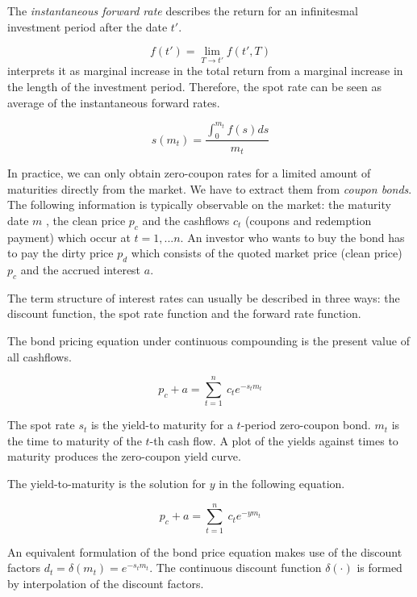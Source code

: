 The \emph{instantaneous forward rate} describes the return for an infinitesmal investment period after the date $t'$.

\begin{equation}
  \label{eq:instforw}
  f(t') = \lim_{T\rightarrow t'}f(t',T)
\end{equation}
\cite{Svensson1994} interprets it as marginal increase in the total return from a marginal increase in the length of the investment period. Therefore, the spot rate can be seen as average of the instantaneous forward rates.

\begin{equation}
  \label{eq:avgforwardrate}
  s(m_t)=\frac{\int_0^{m_t}f(s)ds}{m_t}
\end{equation}

In practice, we can only obtain zero-coupon rates for a limited amount of maturities directly from the market. We have to extract them from \emph{coupon bonds}. The following information is typically observable on the market: the maturity date $m$ , the clean price $p_c$ and the cashflows $c_t$ (coupons and redemption payment) which occur at $t=1,...n$. An investor who wants to buy the bond has to pay the dirty price $p_d$ which consists of the quoted market price (clean price) $p_c$ and the accrued interest $a$.

The term structure of interest rates can usually be described in three ways: the discount function, the
spot rate function and the forward rate function.

The bond pricing equation under continuous compounding is the present value of all cashflows.

\begin{equation}
  \label{bondpriceeq}
  p_c+a = \sum_{t=1}^n \ c_t e^{-s_tm_t}
\end{equation}

The spot rate $s_t$ is the yield-to maturity for a $t$-period zero-coupon bond. $m_t$ is the time to maturity of the $t$-th cash flow. A plot of the yields against times to maturity produces the zero-coupon yield curve.

The yield-to-maturity is the solution for $y$ in the following equation.

\begin{equation}
  \label{yield}
  p_c+a=\sum_{t=1}^n \ c_t e^{-ym_t}
\end{equation}

An equivalent formulation of the bond price equation makes use of the discount factors $d_t=\delta(m_t)=e^{-s_tm_t}$. The continuous discount function $\delta(\cdot)$ is formed by interpolation of the discount factors.


